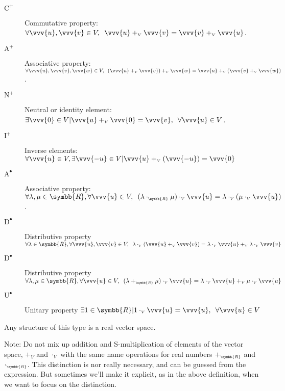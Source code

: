 \begin{itemize}
  \def\hspc{.5}
  \begin{description}
  \item[$\text{C}^+$] Commutative property:
    $\forall\vvv{u},\vvv{v}\in V, \hspace{\hspc em}
    \vvv{u} +_{\scriptscriptstyle V} \vvv{v} = \vvv{v} +_{\scriptscriptstyle V} \vvv{u}$.
  \item[$\text{A}^+$] Associative property:
    $\forall \vvv{u},\vvv{v},\vvv{w}\in V, \hspace{\hspc em}
    (\vvv{u} +_{\scriptscriptstyle V} \vvv{v}) +_{\scriptscriptstyle V} \vvv{w}
    = \vvv{u} +_{\scriptscriptstyle V} (\vvv{v} +_{\scriptscriptstyle V} \vvv{w})$.
  \item[$\text{N}^+$] Neutral or identity element:
    $\exists \vvv{0}\in V | \vvv{u} +_{\scriptscriptstyle V} \vvv{0} = \vvv{v},
    \hspace{\hspc em}\forall \vvv{u}\in V$.
  \item[$\text{I}^+$] Inverse elements:
    $\forall \vvv{u}\in V, \exists\vvv{-u}\in V | \vvv{u} +_{\scriptscriptstyle V} (\vvv{-u}) = \vvv{0}$
  \item[$\text{A}^\vysmblkcircle$] Associative property:
    $\forall \lambda, \mu\in\symbb{R}, \forall \vvv{u}\in V, \hspace{\hspc em}
    (\lambda \cdot_{\scriptscriptstyle\symbb{R}} \mu) \cdot_{\scriptscriptstyle V} \vvv{u}
    = \lambda \cdot_{\scriptscriptstyle V} (\mu \cdot_{\scriptscriptstyle V} \vvv{u})$.
  \item[$\text{D}^\vysmblkcircle$] Distributive property
    $\forall \lambda\in\symbb{R}, \forall \vvv{u},\vvv{v}\in V, \hspace{\hspc em}
    \lambda \cdot_{\scriptscriptstyle V} (\vvv{u} +_{\scriptscriptstyle V} \vvv{v})
    = \lambda\cdot_{\scriptscriptstyle V}\vvv{u} +_{\scriptscriptstyle V} \lambda\cdot_{\scriptscriptstyle V}\vvv{v}$
  \item[$\text{D}^\vysmblkcircle$] Distributive property
    $\forall \lambda,\mu\in\symbb{R}, \forall \vvv{u}\in V, \hspace{\hspc em}
    (\lambda +_{\scriptscriptstyle\symbb{R}} \mu) \cdot_{\scriptscriptstyle V} \vvv{u}
    = \lambda\cdot_{\scriptscriptstyle V}\vvv{u} +_{\scriptscriptstyle V} \mu\cdot_{\scriptscriptstyle V}\vvv{u}$    
  \item[$\text{U}^\vysmblkcircle$] Unitary property
    $\exists 1\in\symbb{R} | 1\cdot_{\scriptscriptstyle V}\vvv{u} = \vvv{u},
    \hspace{\hspc em}\forall\vvv{u}\in V$
  \end{description}
  Any structure of this type is a real vector space.
  
  Note: Do not mix up addition and S-multiplication of elements of the vector space,
  $+_{\scriptscriptstyle V}$ and $\cdot_{\scriptscriptstyle V}$ with the same name operations for
  real numbers $+_{\scriptscriptstyle\symbb{R}}$ and $\cdot_{\scriptscriptstyle\symbb{R}}$.
  This distinction is nor really necessary, and can be guessed from the expression.
  But sometimes we'll make it explicit, as in the above definition,  when we want to focus on the
  distinction.
\end{itemize}

